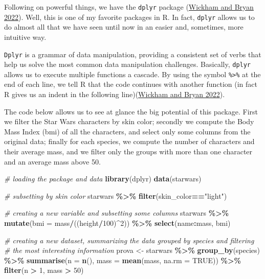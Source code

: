 \documentclass[
]{svmono}
\newenvironment{Shaded}{\begin{snugshade}}{\end{snugshade}}
\newcommand{\AttributeTok}[1]{\textcolor[rgb]{0.13,0.29,0.53}{#1}}
\newcommand{\CommentTok}[1]{\textcolor[rgb]{0.56,0.35,0.01}{\textit{#1}}}
\newcommand{\ConstantTok}[1]{\textcolor[rgb]{0.56,0.35,0.01}{#1}}
\newcommand{\DecValTok}[1]{\textcolor[rgb]{0.00,0.00,0.81}{#1}}
\newcommand{\FunctionTok}[1]{\textcolor[rgb]{0.13,0.29,0.53}{\textbf{#1}}}
\newcommand{\NormalTok}[1]{#1}
\newcommand{\OtherTok}[1]{\textcolor[rgb]{0.56,0.35,0.01}{#1}}
\newcommand{\SpecialCharTok}[1]{\textcolor[rgb]{0.81,0.36,0.00}{\textbf{#1}}}
\newcommand{\StringTok}[1]{\textcolor[rgb]{0.31,0.60,0.02}{#1}}
\begin{document}
Following on powerful things, we have the \texttt{dplyr} package
(\protect\hyperlink{ref-wickham2022}{Wickham and Bryan 2022}). Well, this is one of my favorite packages in R. In fact,
\texttt{dplyr} allows us to do almost all that we have seen until now in an
easier and, sometimes, more intuitive way.

\texttt{Dplyr} is a grammar of data manipulation, providing a consistent set of
verbs that help us solve the most common data manipulation challenges.
Basically, \texttt{dplyr} allows us to execute multiple functions a cascade. By
using the symbol \texttt{\%\textgreater{}\%} at the end of each line, we tell R that the code
continues with another function (in fact R gives us an indent in the
following line)(\protect\hyperlink{ref-wickham2022}{Wickham and Bryan 2022}).

The code below allows us to see at glance the big potential of this
package. First we filter the Star Wars characters by skin color;
secondly we compute the Body Mass Index (bmi) of all the characters, and
select only some columns from the original data; finally for each
species, we compute the number of characters and their average mass, and
we filter only the groups with more than one character and an average
mass above 50.

\begin{Shaded}
\begin{Highlighting}[]
\CommentTok{\# loading the package and data}
\FunctionTok{library}\NormalTok{(dplyr)}
\FunctionTok{data}\NormalTok{(starwars)}

\CommentTok{\# subsetting by skin color}
\NormalTok{starwars }\SpecialCharTok{\%\textgreater{}\%}
        \FunctionTok{filter}\NormalTok{(skin\_color}\SpecialCharTok{==}\StringTok{"light"}\NormalTok{)}

\CommentTok{\# creating a new variable and subsetting some columns}
\NormalTok{starwars }\SpecialCharTok{\%\textgreater{}\%}
        \FunctionTok{mutate}\NormalTok{(}\AttributeTok{bmi =}\NormalTok{ mass}\SpecialCharTok{/}\NormalTok{((height}\SpecialCharTok{/}\DecValTok{100}\NormalTok{)}\SpecialCharTok{\^{}}\DecValTok{2}\NormalTok{)) }\SpecialCharTok{\%\textgreater{}\%}
        \FunctionTok{select}\NormalTok{(name}\SpecialCharTok{:}\NormalTok{mass, bmi)}

\CommentTok{\# creating a new dataset, summarizing the data grouped by species and filtering}
\CommentTok{\# the most interesting information}
\NormalTok{prova }\OtherTok{\textless{}{-}}\NormalTok{ starwars }\SpecialCharTok{\%\textgreater{}\%}
        \FunctionTok{group\_by}\NormalTok{(species) }\SpecialCharTok{\%\textgreater{}\%}
        \FunctionTok{summarise}\NormalTok{(}\AttributeTok{n =} \FunctionTok{n}\NormalTok{(), }
                  \AttributeTok{mass =} \FunctionTok{mean}\NormalTok{(mass, }\AttributeTok{na.rm =} \ConstantTok{TRUE}\NormalTok{)) }\SpecialCharTok{\%\textgreater{}\%}
        \FunctionTok{filter}\NormalTok{(n }\SpecialCharTok{\textgreater{}} \DecValTok{1}\NormalTok{, }
\NormalTok{               mass }\SpecialCharTok{\textgreater{}} \DecValTok{50}\NormalTok{)}
\end{Highlighting}
\end{Shaded}
\end{document}
